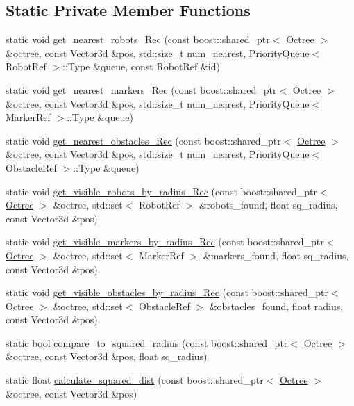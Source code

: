 \subsection*{Static Private Member Functions}
\begin{CompactItemize}
\item 
static void \hyperlink{class_octree_utilities_082a4c0a6384ee0a467378f5e6552d9a}{get\_\-nearest\_\-robots\_\-Rec} (const boost::shared\_\-ptr$<$ \hyperlink{class_octree}{Octree} $>$ \&octree, const Vector3d \&pos, std::size\_\-t num\_\-nearest, PriorityQueue$<$ RobotRef $>$::Type \&queue, const RobotRef \&id)
\item 
static void \hyperlink{class_octree_utilities_9ccc20518e6adfa2f2d7d28d368d53c2}{get\_\-nearest\_\-markers\_\-Rec} (const boost::shared\_\-ptr$<$ \hyperlink{class_octree}{Octree} $>$ \&octree, const Vector3d \&pos, std::size\_\-t num\_\-nearest, PriorityQueue$<$ MarkerRef $>$::Type \&queue)
\item 
static void \hyperlink{class_octree_utilities_168f67374ca6c78060e016441c11f399}{get\_\-nearest\_\-obstacles\_\-Rec} (const boost::shared\_\-ptr$<$ \hyperlink{class_octree}{Octree} $>$ \&octree, const Vector3d \&pos, std::size\_\-t num\_\-nearest, PriorityQueue$<$ ObstacleRef $>$::Type \&queue)
\item 
static void \hyperlink{class_octree_utilities_6f5879dfd1fd84edcadb03de4cf03dd6}{get\_\-visible\_\-robots\_\-by\_\-radius\_\-Rec} (const boost::shared\_\-ptr$<$ \hyperlink{class_octree}{Octree} $>$ \&octree, std::set$<$ RobotRef $>$ \&robots\_\-found, float sq\_\-radius, const Vector3d \&pos)
\item 
static void \hyperlink{class_octree_utilities_9067642270dc482ceee34c004af054b6}{get\_\-visible\_\-markers\_\-by\_\-radius\_\-Rec} (const boost::shared\_\-ptr$<$ \hyperlink{class_octree}{Octree} $>$ \&octree, std::set$<$ MarkerRef $>$ \&markers\_\-found, float sq\_\-radius, const Vector3d \&pos)
\item 
static void \hyperlink{class_octree_utilities_2d10ca715823cfe5ff3804e2b5c1628a}{get\_\-visible\_\-obstacles\_\-by\_\-radius\_\-Rec} (const boost::shared\_\-ptr$<$ \hyperlink{class_octree}{Octree} $>$ \&octree, std::set$<$ ObstacleRef $>$ \&obstacles\_\-found, float radius, const Vector3d \&pos)
\item 
static bool \hyperlink{class_octree_utilities_25ecea967e3734fd326470404a043489}{compare\_\-to\_\-squared\_\-radius} (const boost::shared\_\-ptr$<$ \hyperlink{class_octree}{Octree} $>$ \&octree, const Vector3d \&pos, float sq\_\-radius)
\item 
static float \hyperlink{class_octree_utilities_9a9c30e007a5b97651933c3ab76a7801}{calculate\_\-squared\_\-dist} (const boost::shared\_\-ptr$<$ \hyperlink{class_octree}{Octree} $>$ \&octree, const Vector3d \&pos)
\end{CompactItemize}
